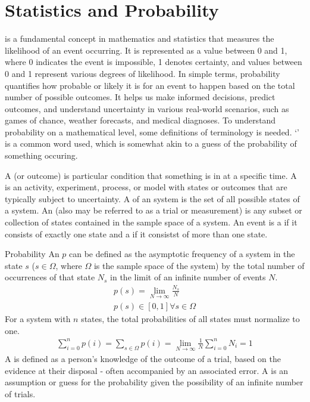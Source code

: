 \chapter{Statistics and Probability}
\thispagestyle{fancy}

 is a fundamental concept in mathematics and statistics that measures the likelihood of an event occurring. It is represented as a value between 0 and 1, where 0 indicates the event is impossible, 1 denotes certainty, and values between 0 and 1 represent various degrees of likelihood. In simple terms, probability quantifies how probable or likely it is for an event to happen based on the total number of possible outcomes. It helps us make informed decisions, predict outcomes, and understand uncertainty in various real-world scenarios, such as games of chance, weather forecasts, and medical diagnoses. To understand probability on a mathematical level, some definitions of terminology is needed. `' is a common word used, which is somewhat akin to a guess of the probability of something occuring.

A  (or outcome) is particular condition that something is in at a specific time. A  is an activity, experiment, process, or model with states or outcomes that are typically subject to uncertainty. A  of an system is the set of all possible states of a system. An  (also may be referred to as a trial or measurement) is any subset or collection of states contained in the sample space of a system. An event is a  if it consists of exactly one state and a  if it consistst of more than one state.

\begin{defn}[Probability]{Probability}
An  $p$ can be defined as the asymptotic frequency of a system in the state $s$ ($s \in \Omega$, where $\Omega$ is the sample space of the system) by the total number of occurrences of that state $N_s$ in the limit of an infinite number of events $N$.
    \begin{align}
        p(s) = \lim_{N\rightarrow\infty}\frac{N_s}{N} \\
	p(s) \in [0,1] \forall s \in \Omega
    \end{align}
For a system with $n$ states, the total probabilities of all states must normalize to one.
    \begin{align}
        \sum_{i=0}^{n}p(i) = \sum_{s \in \Omega}p(i) = \lim_{N\rightarrow\infty}\frac{1}{N}\sum_{i=0}^{n}N_i = 1
    \end{align}
A  is defined as a person's knowledge of the outcome of a trial, based on the evidence at their disposal - often accompanied by an associated error. A  is an assumption or guess for the probability given the possibility of an infinite number of trials.
\end{defn}

